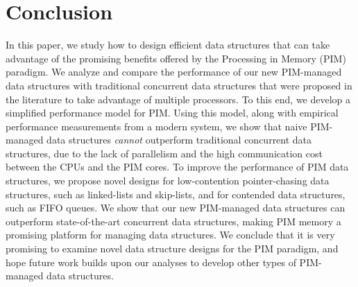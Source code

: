 \section{Conclusion}
\label{section:conclusion}

In this paper, we study how to design efficient data structures that
can take advantage of the promising benefits offered by the Processing
in Memory (PIM) paradigm.  We analyze and compare the performance of
our new PIM-managed data structures with traditional concurrent data
structures that were proposed in the literature to take advantage of
multiple processors.  To this end, we develop a simplified performance
model for PIM.  Using this model, along with empirical performance
measurements from a modern system, we show that naive PIM-managed data
structures \emph{cannot} outperform traditional concurrent data
structures, due to the lack of parallelism and the high communication
cost between the CPUs and the PIM cores.  To improve the performance
of PIM data structures, we propose novel designs for low-contention
pointer-chasing data structures, such as linked-lists and skip-lists,
and for contended data structures, such as FIFO queues.  We show that
our new PIM-managed data structures can outperform state-of-the-art
concurrent data structures, making PIM memory a promising platform for
managing data structures. We conclude that it is very promising to
examine novel data structure designs for the PIM paradigm, and hope
future work builds upon our analyses to develop other types of
PIM-managed data structures.

 
